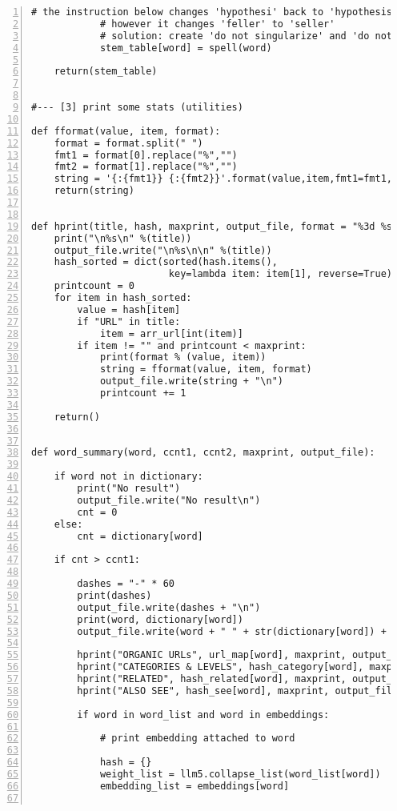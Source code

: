 \documentclass[oneside,10pt]{book}
\begin{document}
\begin{lstlisting}[numbers=left]
            # the instruction below changes 'hypothesi' back to 'hypothesis'
            # however it changes 'feller' to 'seller' 
            # solution: create 'do not singularize' and 'do not autocorrect' lists
            stem_table[word] = spell(word) 

    return(stem_table)


#--- [3] print some stats (utilities)  

def fformat(value, item, format):
    format = format.split(" ")
    fmt1 = format[0].replace("%","")
    fmt2 = format[1].replace("%","")
    string = '{:{fmt1}} {:{fmt2}}'.format(value,item,fmt1=fmt1,fmt2=fmt2)
    return(string)


def hprint(title, hash, maxprint, output_file, format = "%3d %s"):
    print("\n%s\n" %(title))
    output_file.write("\n%s\n\n" %(title))
    hash_sorted = dict(sorted(hash.items(), 
                        key=lambda item: item[1], reverse=True))
    printcount = 0
    for item in hash_sorted:
        value = hash[item]
        if "URL" in title: 
            item = arr_url[int(item)] 
        if item != "" and printcount < maxprint:
            print(format % (value, item))
            string = fformat(value, item, format)
            output_file.write(string + "\n")
            printcount += 1

    return()


def word_summary(word, ccnt1, ccnt2, maxprint, output_file):  

    if word not in dictionary:
        print("No result")
        output_file.write("No result\n")
        cnt = 0
    else:   
        cnt = dictionary[word]

    if cnt > ccnt1:

        dashes = "-" * 60
        print(dashes)
        output_file.write(dashes + "\n")
        print(word, dictionary[word])
        output_file.write(word + " " + str(dictionary[word]) + "\n")

        hprint("ORGANIC URLs", url_map[word], maxprint, output_file)
        hprint("CATEGORIES & LEVELS", hash_category[word], maxprint, output_file) 
        hprint("RELATED", hash_related[word], maxprint, output_file)
        hprint("ALSO SEE", hash_see[word], maxprint, output_file)

        if word in word_list and word in embeddings:

            # print embedding attached to word

            hash = {}
            weight_list = llm5.collapse_list(word_list[word])
            embedding_list = embeddings[word]


\end{lstlisting}
\end{document}

